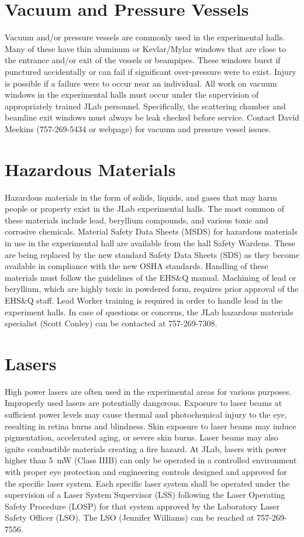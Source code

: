 \documentclass[12pt]{report}
\begin{document}
\section{Vacuum and Pressure Vessels}

Vacuum and/or pressure vessels are commonly used in the experimental halls. Many 
of these have thin aluminum or Kevlar/Mylar windows that are close to the entrance 
and/or exit of the vessels or beampipes. These windows burst if punctured accidentally 
or can fail if significant over-pressure were to exist. Injury is possible if a failure 
were to occur near an individual. All work on vacuum windows in the experimental halls 
must occur under the supervision of appropriately trained JLab personnel. Specifically, 
the scattering chamber and beamline exit windows must always be leak checked before 
service. Contact David Meekins (757-269-5434 or webpage) for vacuum and pressure vessel
issues.

\section{Hazardous Materials}

Hazardous materials in the form of solids, liquids, and gases that may harm people or 
property exist in the JLab experimental halls. The most common of these materials 
include lead, beryllium compounds, and various toxic and corrosive chemicals. Material 
Safety Data Sheets (MSDS) for hazardous materials in use in the experimental hall are 
available from the hall Safety Wardens. These are being replaced by the new standard
Safety Data Sheets (SDS) as they become available in compliance with the new OSHA 
standards. Handling of these materials must follow the guidelines of the EHS\&Q manual. 
Machining of lead or beryllium, which are highly toxic in powdered form, requires prior 
approval of the EHS\&Q staff. Lead Worker training is required in order to handle lead in 
the experiment halls. In case of questions or concerns, the JLab hazardous materials 
specialist (Scott Conley) can be contacted at 757-269-7308.

\section{Lasers}

High power lasers are often used in the experimental areas for various purposes. Improperly 
used lasers are potentially dangerous. Exposure to laser beams at sufficient power levels 
may cause thermal and photochemical injury to the eye, resulting in retina burns and 
blindness. Skin exposure to laser beams may induce pigmentation, accelerated aging, or 
severe skin burns. Laser beams may also ignite combustible materials creating a fire hazard. 
At JLab, lasers with power higher than 5~mW (Class IIIB) can only be operated in a controlled 
environment with proper eye protection and engineering controls designed and approved for the 
specific laser system. Each specific laser system shall be operated under the supervision of 
a Laser System Supervisor (LSS) following the Laser Operating Safety Procedure (LOSP) for 
that system approved by the Laboratory Laser Safety Officer (LSO). The LSO (Jennifer Williams) can 
be reached at 757-269-7556.
%
%
\end{document}
